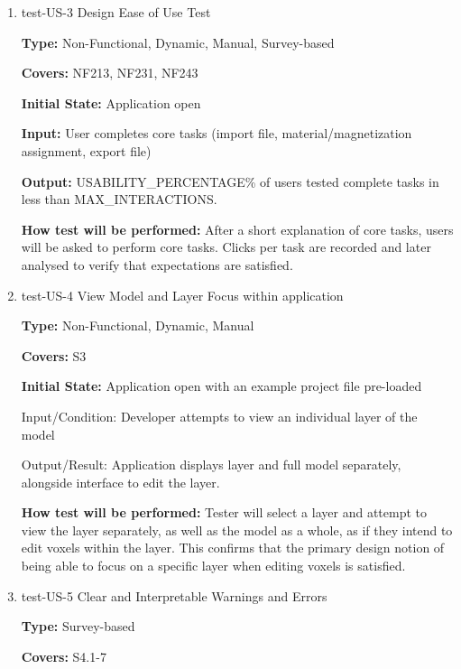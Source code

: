 \documentclass[12pt, titlepage]{article}
\begin{document}
\begin{enumerate}
Acceptance Criteria: All ratios must meet 3:1 contrast ratio for WCAG 2.0 compliance.

\item{test-US-3 Design Ease of Use Test\\}
\label{sec:t-nf-3}

\textbf{Type:} Non-Functional, Dynamic, Manual, Survey-based

\textbf{Covers:} NF213, NF231, NF243
					
\textbf{Initial State:} Application open
					
\textbf{Input:} User completes core tasks (import file, material/magnetization assignment, export file)
					
\textbf{Output:} USABILITY\_PERCENTAGE\% of users tested complete tasks in less than MAX\_INTERACTIONS.
					
\textbf{How test will be performed:} After a short explanation of core tasks, users will be asked to perform core tasks. Clicks per task
are recorded and later analysed to verify that expectations are satisfied.

\item{test-US-4 View Model and Layer Focus within application\\}
\label{sec:t-nf-4}

\textbf{Type:} Non-Functional, Dynamic, Manual

\textbf{Covers:} S3 %
					
\textbf{Initial State:} Application open with an example project file pre-loaded
					
Input/Condition: Developer attempts to view an individual layer of the model
					
Output/Result: Application displays layer and full model separately, alongside interface to edit the layer.
					
\textbf{How test will be performed:} Tester will select a layer and attempt to view the layer separately, as well as the model as a whole, 
as if they intend to edit voxels within the layer. This confirms that the primary design notion of being able to focus on a specific
layer when editing voxels is satisfied.

\item{test-US-5 Clear and Interpretable Warnings and Errors\\}
\label{sec:t-nf-5}

\textbf{Type:} Survey-based

\textbf{Covers:} S4.1-7 %
					

\end{enumerate}
\end{document}
